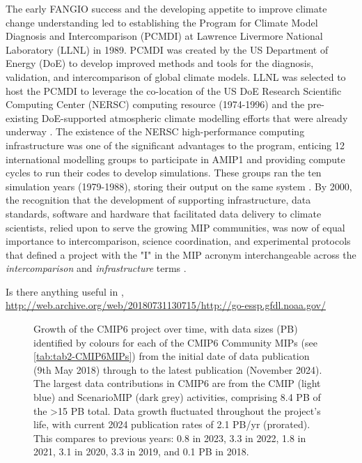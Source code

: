 \documentclass[gmd, preprint]{copernicus}
\def\cred#1{{\color{red}#1}}
\begin{document}
The early FANGIO success and the developing appetite to improve climate change understanding led to establishing the Program for Climate Model Diagnosis and Intercomparison (PCMDI) at Lawrence Livermore National Laboratory (LLNL) in 1989. PCMDI was created by the US Department of Energy (DoE) to develop improved methods and tools for the diagnosis, validation, and intercomparison of global climate models. LLNL was selected to host the PCMDI to leverage the co-location of the US DoE Research Scientific Computing Center (NERSC) computing resource (1974-1996) and the pre-existing DoE-supported atmospheric climate modelling efforts that were already underway \citep{potter_celebrating_2011}. The existence of the NERSC high-performance computing infrastructure was one of the significant advantages to the program, enticing 12 international modelling groups to participate in AMIP1 and providing compute cycles to run their codes to develop simulations. These groups ran the ten simulation years (1979-1988), storing their output on the same system \citep{gates_amip_1991, gates_amip_1992}. By 2000, the recognition that the development of supporting infrastructure, data standards, software and hardware that facilitated data delivery to climate scientists, relied upon to serve the growing MIP communities, was now of equal importance to intercomparison, science coordination, and experimental protocols that defined a project with the "I" in the MIP acronym interchangeable across the \textit{intercomparison} and \emph{infrastructure} terms \citep{gleckler_amip_2001}.

\cred{Is there anything useful in \citet{balaji_requirements_2018}, \citet{petrie_coordinating_2021} \url{http://web.archive.org/web/20180731130715/http://go-essp.gfdl.noaa.gov/}}

\begin{figure}
    \centering
    
    \caption{Growth of the CMIP6 project over time, with data sizes (PB) identified by colours for each of the CMIP6 Community MIPs (see \autoref{tab:tab2-CMIP6MIPs}) from the initial date of data publication (9th May 2018) through to the latest publication (November 2024). The largest data contributions in CMIP6 are from the CMIP (light blue) and ScenarioMIP (dark grey) activities, comprising 8.4 PB of the >15 PB total. Data growth fluctuated throughout the project's life, with current 2024 publication rates of 2.1 PB/yr (prorated). This compares to previous years: 0.8 in 2023, 3.3 in 2022, 1.8 in 2021, 3.1 in 2020, 3.3 in 2019, and 0.1 PB in 2018.}
    \label{fig:fig2-CMIP6DataGrowth}
\end{figure}
\end{document}
